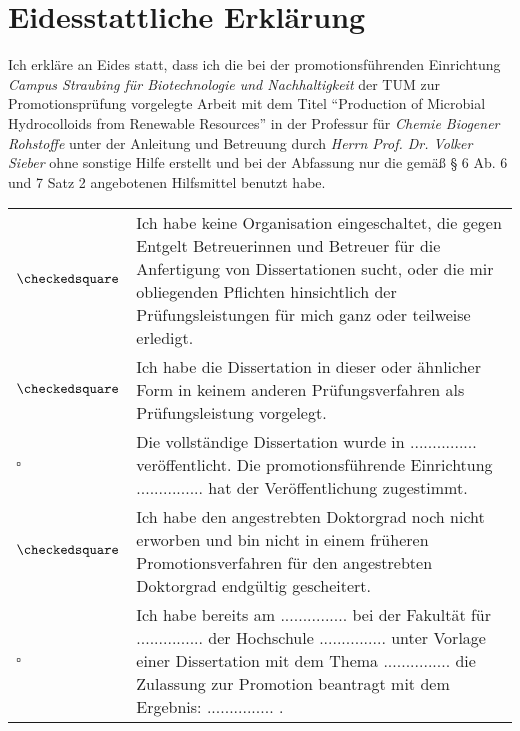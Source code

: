 \clearpage
{}
{}
\section*{Eidesstattliche Erklärung}
Ich erkläre an Eides statt, dass ich die bei der promotionsführenden Einrichtung \textit{Campus Straubing für Biotechnologie und Nachhaltigkeit} der TUM zur Promotionsprüfung vorgelegte Arbeit mit dem Titel \enquote{Production of Microbial Hydrocolloids from Renewable Resources} in der Professur für \textit{Chemie Biogener Rohstoffe} unter der Anleitung und Betreuung durch \textit{Herrn Prof. Dr. Volker Sieber} ohne sonstige Hilfe erstellt und bei der Abfassung nur die gemäß § 6 Ab. 6 und 7 Satz 2 angebotenen Hilfsmittel benutzt habe.

{
\noindent
\setlength{\tabcolsep}{0pt}
\begin{tabular}{p{1cm}p{14cm}}
	\hspace{0.5cm}$\checkedsquare$ & Ich habe keine Organisation eingeschaltet, die gegen Entgelt Betreuerinnen und Betreuer für die Anfertigung von Dissertationen sucht, oder die mir obliegenden Pflichten hinsichtlich der Prüfungsleistungen für mich ganz oder teilweise erledigt. \\
	\hspace{0.5cm}$\checkedsquare$ & Ich habe die Dissertation in dieser oder ähnlicher Form in keinem anderen Prüfungsverfahren als Prüfungsleistung vorgelegt. \\
	\hspace{0.5cm}$\square$ & Die vollständige Dissertation wurde in ............... veröffentlicht. Die promotionsführende Einrichtung ............... hat der Veröffentlichung zugestimmt. \\
	\hspace{0.5cm}$\checkedsquare$ & Ich habe den angestrebten Doktorgrad noch nicht erworben und bin nicht in einem früheren Promotionsverfahren für den angestrebten Doktorgrad endgültig gescheitert. \\
	\hspace{0.5cm}$\square$ & Ich habe bereits am ............... bei der Fakultät für ............... der Hochschule ............... unter Vorlage einer Dissertation mit dem Thema ............... die Zulassung zur Promotion beantragt mit dem Ergebnis: ............... . \\
\end{tabular}
}


